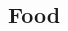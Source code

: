 \documentclass[a0,landscape]{a0poster}
\begin{document}
\begin{multicols}{4} %


%
%
%
%


\color{SaddleBrown} %

\section*{Food}

\end{multicols}
\end{document}
